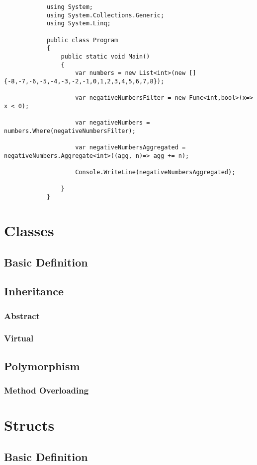 \documentclass {amsart}
\begin{document}
	\begin{lstlisting}
			using System;
			using System.Collections.Generic;
			using System.Linq;
			
			public class Program
			{
				public static void Main()
				{
					var numbers = new List<int>(new [] {-8,-7,-6,-5,-4,-3,-2,-1,0,1,2,3,4,5,6,7,8});
			
					var negativeNumbersFilter = new Func<int,bool>(x=> x < 0);
			
					var negativeNumbers = numbers.Where(negativeNumbersFilter);
			
					var negativeNumbersAggregated = negativeNumbers.Aggregate<int>((agg, n)=> agg += n);
			
					Console.WriteLine(negativeNumbersAggregated);
					
				}
			}
	\end{lstlisting}



\section{Classes}
	\subsection{Basic Definition}
	\subsection{Inheritance}
		\subsubsection{Abstract}
		\subsubsection{Virtual}
	\subsection{Polymorphism}
		\subsubsection{Method Overloading}
\section{Structs}
	\subsection{Basic Definition}
	
\end{document}
